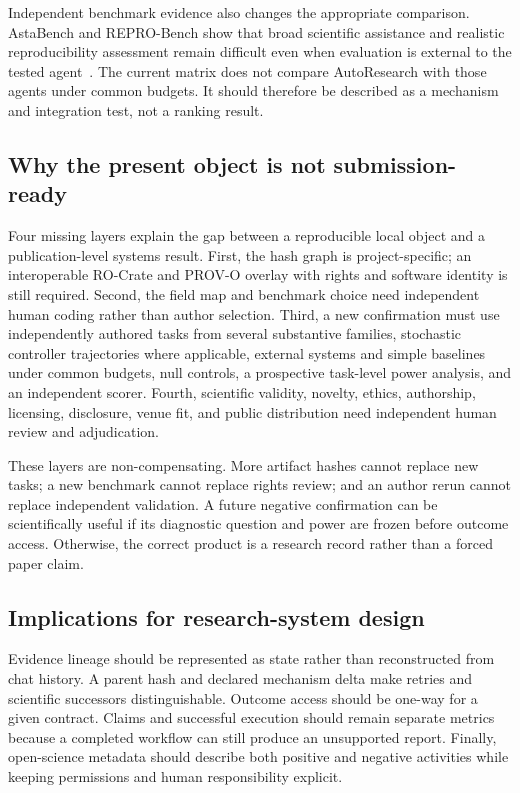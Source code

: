 Independent benchmark evidence also changes the appropriate comparison.
AstaBench and REPRO-Bench show that broad scientific assistance and realistic
reproducibility assessment remain difficult even when evaluation is external
to the tested agent~\cite{bragg2026astabench,hu2025reprobench}. The current
matrix does not compare AutoResearch with those agents under common budgets.
It should therefore be described as a mechanism and integration test, not a
ranking result.

\subsection{Why the present object is not submission-ready}

Four missing layers explain the gap between a reproducible local object and a
publication-level systems result. First, the hash graph is project-specific;
an interoperable RO-Crate and PROV-O overlay with rights and software identity
is still required. Second, the field map and benchmark choice need independent
human coding rather than author selection. Third, a new confirmation must use
independently authored tasks from several substantive families, stochastic
controller trajectories where applicable, external systems and simple
baselines under common budgets, null controls, a prospective task-level power
analysis, and an independent scorer. Fourth, scientific validity, novelty,
ethics, authorship, licensing, disclosure, venue fit, and public distribution
need independent human review and adjudication.

These layers are non-compensating. More artifact hashes cannot replace new
tasks; a new benchmark cannot replace rights review; and an author rerun
cannot replace independent validation. A future negative confirmation can be
scientifically useful if its diagnostic question and power are frozen before
outcome access. Otherwise, the correct product is a research record rather
than a forced paper claim.

\subsection{Implications for research-system design}

Evidence lineage should be represented as state rather than reconstructed
from chat history. A parent hash and declared mechanism delta make retries and
scientific successors distinguishable. Outcome access should be one-way for a
given contract. Claims and successful execution should remain separate
metrics because a completed workflow can still produce an unsupported report.
Finally, open-science metadata should describe both positive and negative
activities while keeping permissions and human responsibility explicit.
